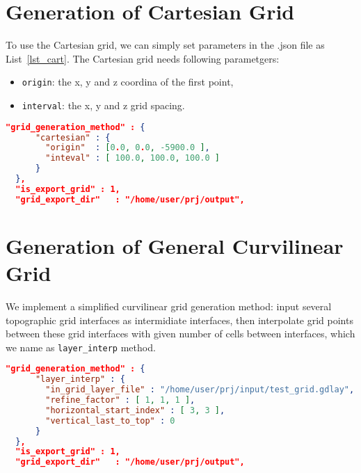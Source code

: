 \section{Generation of Cartesian Grid} \label{sec_cartesian} 

To use the Cartesian grid, we can simply set parameters in the .json file as List~\ref{lst_cart}.
The Cartesian grid needs following parametgers:
\begin{itemize}
  \item \verb|origin|: the x, y and z coordina of the first point,
  \item \verb|interval|: the x, y and z grid spacing. 
\end{itemize}

\begin{lstlisting}[language=json,
 caption={Example of Using Cartesian Grid in .json},
 label={lst_cart},
 frame=tb]
  "grid_generation_method" : {
      "cartesian" : {
        "origin"  : [0.0, 0.0, -5900.0 ],
        "inteval" : [ 100.0, 100.0, 100.0 ]
      }
  },
  "is_export_grid" : 1,
  "grid_export_dir"   : "/home/user/prj/output",               
\end{lstlisting}

\section{Generation of General Curvilinear Grid} \label{sec_curv} 

We implement a simplified curvilinear grid generation method:
input several topographic grid interfaces as intermidiate interfaces, 
then interpolate grid points between these grid interfaces
with given number of cells between interfaces, which we name as \verb|layer_interp| method.

\begin{lstlisting}[language=json,
 title={Usage Example of \texttt{layer\_interp} in .json},
 label={lst_curv},
 frame=tb]
  "grid_generation_method" : {
      "layer_interp" : {
        "in_grid_layer_file" : "/home/user/prj/input/test_grid.gdlay",  
        "refine_factor" : [ 1, 1, 1 ],
        "horizontal_start_index" : [ 3, 3 ],
        "vertical_last_to_top" : 0
      }
  },
  "is_export_grid" : 1,
  "grid_export_dir"   : "/home/user/prj/output",               
\end{lstlisting}

